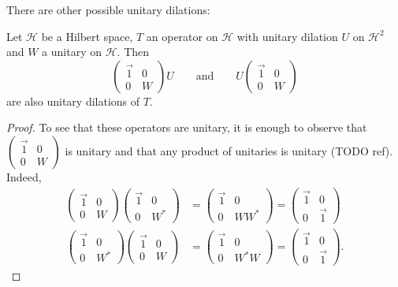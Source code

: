 There are other possible unitary dilations:
\begin{lemma}
Let $\mathcal{H}$ be a Hilbert space, $T$ an operator on $\mathcal{H}$ with unitary dilation $U$ on $\mathcal{H}^2$ and $W$ a unitary on $\mathcal{H}$. Then
\[ \begin{pmatrix}
\vec{1} & 0 \\
0 & W
\end{pmatrix}U \qquad\text{and}\qquad U\begin{pmatrix}
\vec{1} & 0 \\
0 & W
\end{pmatrix} \]
are also unitary dilations of $T$.
\end{lemma}
\begin{proof}
To see that these operators are unitary, it is enough to observe that $\begin{pmatrix}
\vec{1} & 0 \\
0 & W
\end{pmatrix}$ is unitary and that any product of unitaries is unitary (TODO ref). Indeed,
\begin{align*}
\begin{pmatrix}
\vec{1} & 0 \\
0 & W
\end{pmatrix}\begin{pmatrix}
\vec{1} & 0 \\
0 & W^*
\end{pmatrix}
&= \begin{pmatrix}
\vec{1} & 0 \\
0 & WW^*
\end{pmatrix} = \begin{pmatrix}
\vec{1} & 0 \\
0 & \vec{1}
\end{pmatrix} \\
\begin{pmatrix}
\vec{1} & 0 \\
0 & W^*
\end{pmatrix}\begin{pmatrix}
\vec{1} & 0 \\
0 & W
\end{pmatrix}
&= \begin{pmatrix}
\vec{1} & 0 \\
0 & W^*W
\end{pmatrix} = \begin{pmatrix}
\vec{1} & 0 \\
0 & \vec{1}
\end{pmatrix}.
\end{align*} 


\end{proof}
